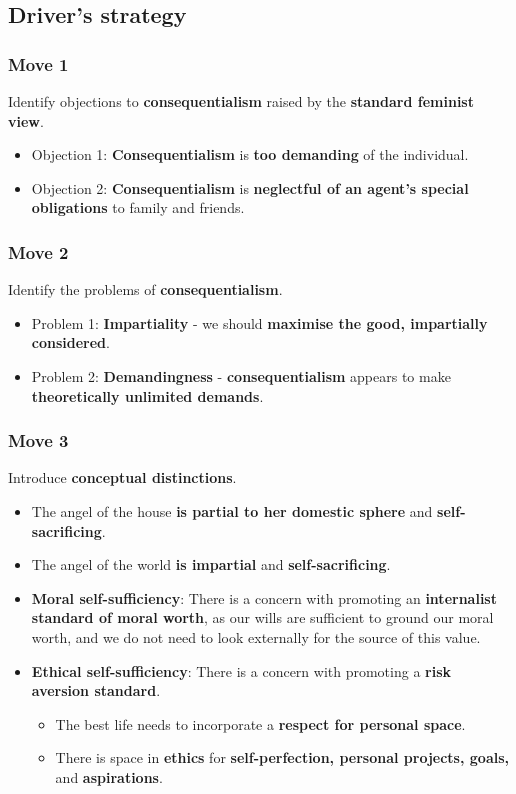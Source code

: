 \documentclass[11pt]{article}
\begin{document}
 \newpage
\subsection{Driver's strategy}
\label{sec:org7cf16e6}

\subsubsection{Move 1}
\label{sec:orga8302b4}
Identify objections to \textbf{consequentialism} raised by the \textbf{standard feminist view}.
\begin{itemize}
\item Objection 1: \textbf{Consequentialism} is \textbf{too demanding} of the individual.
\item Objection 2: \textbf{Consequentialism} is \textbf{neglectful of an agent's special obligations} to family and friends.
\end{itemize}
\subsubsection{Move 2}
\label{sec:org036b42a}
Identify the problems of \textbf{consequentialism}.
\begin{itemize}
\item Problem 1: \textbf{Impartiality} - we should \textbf{maximise the good, impartially considered}.
\item Problem 2: \textbf{Demandingness} - \textbf{consequentialism} appears to make \textbf{theoretically unlimited demands}.
\end{itemize}
\subsubsection{Move 3}
\label{sec:orgdbf2e08}
Introduce \textbf{conceptual distinctions}.
\begin{itemize}
\item The angel of the house \textbf{is partial to her domestic sphere} and \textbf{self-sacrificing}.
\item The angel of the world \textbf{is impartial} and \textbf{self-sacrificing}.
\item \textbf{Moral self-sufficiency}: There is a concern with promoting an \textbf{internalist standard of moral worth}, as our wills are sufficient to ground our moral worth, and we do not need to look externally for the source of this value.
\item \textbf{Ethical self-sufficiency}: There is a concern with promoting a \textbf{risk aversion standard}.
\begin{itemize}
\item The best life needs to incorporate a \textbf{respect for personal space}.
\item There is space in \textbf{ethics} for \textbf{self-perfection, personal projects, goals,} and \textbf{aspirations}.
\end{itemize}
\end{itemize}
\end{document}
